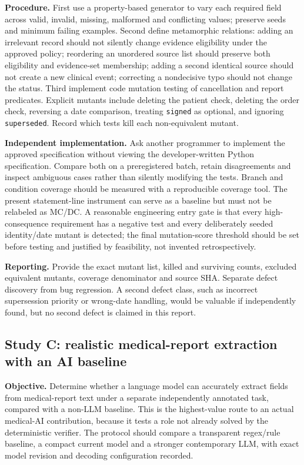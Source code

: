 \documentclass[11pt,twocolumn]{article}
\newcommand{\code}[1]{\texttt{#1}}
\begin{document}
\textbf{Procedure.} First use a property-based generator to vary each required field across valid, invalid, missing, malformed and conflicting values; preserve seeds and minimum failing examples. Second define metamorphic relations: adding an irrelevant record should not silently change evidence eligibility under the approved policy; reordering an unordered source list should preserve both eligibility and evidence-set membership; adding a second identical source should not create a new clinical event; correcting a nondecisive typo should not change the status. Third implement code mutation testing of cancellation and report predicates. Explicit mutants include deleting the patient check, deleting the order check, reversing a date comparison, treating \code{signed} as optional, and ignoring \code{superseded}. Record which tests kill each non-equivalent mutant.

\textbf{Independent implementation.} Ask another programmer to implement the approved specification without viewing the developer-written Python specification. Compare both on a preregistered batch, retain disagreements and inspect ambiguous cases rather than silently modifying the tests. Branch and condition coverage should be measured with a reproducible coverage tool. The present statement-line instrument can serve as a baseline but must not be relabeled as MC/DC. A reasonable engineering entry gate is that every high-consequence requirement has a negative test and every deliberately seeded identity/date mutant is detected; the final mutation-score threshold should be set before testing and justified by feasibility, not invented retrospectively.

\textbf{Reporting.} Provide the exact mutant list, killed and surviving counts, excluded equivalent mutants, coverage denominator and source SHA. Separate defect discovery from bug regression. A second defect class, such as incorrect supersession priority or wrong-date handling, would be valuable if independently found, but no second defect is claimed in this report.

\subsection{Study C: realistic medical-report extraction with an AI baseline}
\textbf{Objective.} Determine whether a language model can accurately extract fields from medical-report text under a separate independently annotated task, compared with a non-LLM baseline. This is the highest-value route to an actual medical-AI contribution, because it tests a role not already solved by the deterministic verifier. The protocol should compare a transparent regex/rule baseline, a compact current model and a stronger contemporary LLM, with exact model revision and decoding configuration recorded.
\end{document}

